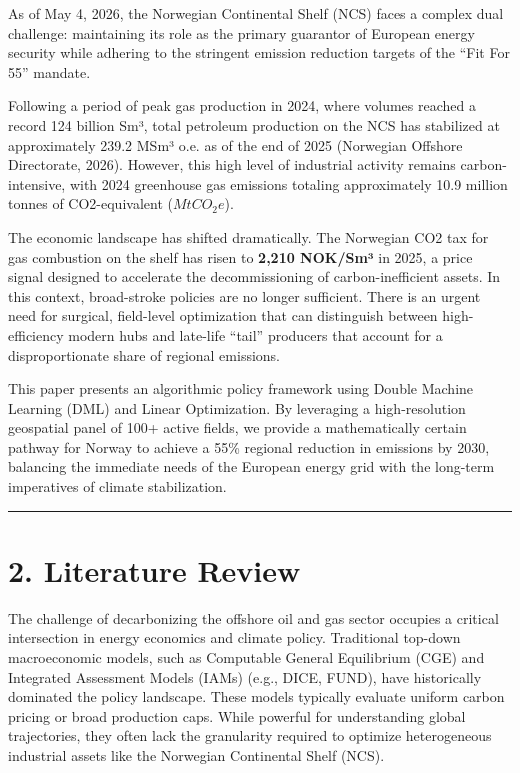 \documentclass[
  11pt,
]{article}
\begin{document}
As of May 4, 2026, the Norwegian Continental Shelf (NCS) faces a complex
dual challenge: maintaining its role as the primary guarantor of
European energy security while adhering to the stringent emission
reduction targets of the ``Fit For 55'' mandate.

Following a period of peak gas production in 2024, where volumes reached
a record 124 billion Sm³, total petroleum production on the NCS has
stabilized at approximately 239.2 MSm³ o.e. as of the end of 2025
(Norwegian Offshore Directorate, 2026). However, this high level of
industrial activity remains carbon-intensive, with 2024 greenhouse gas
emissions totaling approximately 10.9 million tonnes of CO2-equivalent
(\(MtCO_2e\)).

The economic landscape has shifted dramatically. The Norwegian CO2 tax
for gas combustion on the shelf has risen to \textbf{2,210 NOK/Sm³} in
2025, a price signal designed to accelerate the decommissioning of
carbon-inefficient assets. In this context, broad-stroke policies are no
longer sufficient. There is an urgent need for surgical, field-level
optimization that can distinguish between high-efficiency modern hubs
and late-life ``tail'' producers that account for a disproportionate
share of regional emissions.

This paper presents an algorithmic policy framework using Double Machine
Learning (DML) and Linear Optimization. By leveraging a high-resolution
geospatial panel of 100+ active fields, we provide a mathematically
certain pathway for Norway to achieve a 55\% regional reduction in
emissions by 2030, balancing the immediate needs of the European energy
grid with the long-term imperatives of climate stabilization.

\begin{center}\rule{0.5\linewidth}{0.5pt}\end{center}

\section{2. Literature Review}\label{literature-review}

The challenge of decarbonizing the offshore oil and gas sector occupies
a critical intersection in energy economics and climate policy.
Traditional top-down macroeconomic models, such as Computable General
Equilibrium (CGE) and Integrated Assessment Models (IAMs) (e.g., DICE,
FUND), have historically dominated the policy landscape. These models
typically evaluate uniform carbon pricing or broad production caps.
While powerful for understanding global trajectories, they often lack
the granularity required to optimize heterogeneous industrial assets
like the Norwegian Continental Shelf (NCS).
\end{document}

